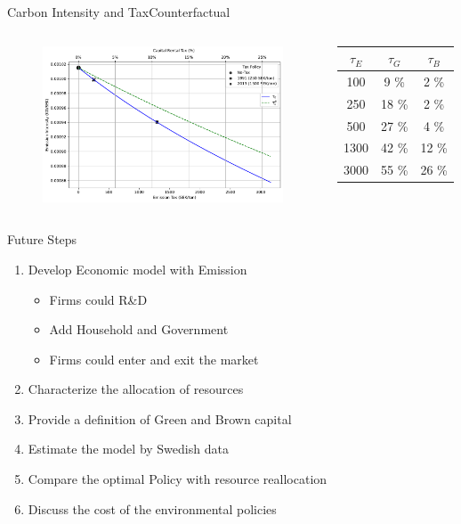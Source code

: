 \documentclass[aspectratio=169]{beamer}
\begin{document}
\begin{frame}{Carbon Intensity and Tax}{{Counterfactual}}{
	\begin{columns}[t]
		\begin{figure}[t]
		\centering
		\includegraphics[width=.85\textwidth]{Figures/intensity_tax_premium.pdf}
		\end{figure}
		\begin{table}[htbp]
			\begin{tabular}{ccc}
				\toprule
				$ \tau_E$ & $ \tau_G$ & $ \tau_B$ \\
				\midrule
					 100 &        9 \% &        2 \% \\
					 250 &       18 \% &        2 \% \\
					 500 &       27 \% &        4 \% \\
					1300 &       42 \% &       12 \% \\
					3000 &       55 \% &       26 \% \\
				\bottomrule
				\end{tabular}
		\end{table}
	\end{columns}
}
\end{frame}


\begin{frame}[noframenumbering]{Future Steps}
	\begin{enumerate}
		\item\textcolor<1->{fg!30}{ Develop Economic model with Emission }
		\begin{itemize}
			\item<1-| alert@1> Firms could R\&D
			\item<1-| alert@1> Add Household and Government
			\item<1-| alert@1> Firms could enter and exit the market
		\end{itemize} 
		\item\textcolor<1->{fg!30}{Characterize the allocation of resources }
		\item<1-| alert@1> {Provide a definition of Green and Brown capital}
		\item<1-| alert@1> Estimate the model by Swedish data 
		\item<1-| alert@1> Compare the optimal Policy with resource reallocation 
		\item<1-| alert@1> Discuss the cost of the environmental policies 
	\end{enumerate}
\end{frame}
\end{document}

